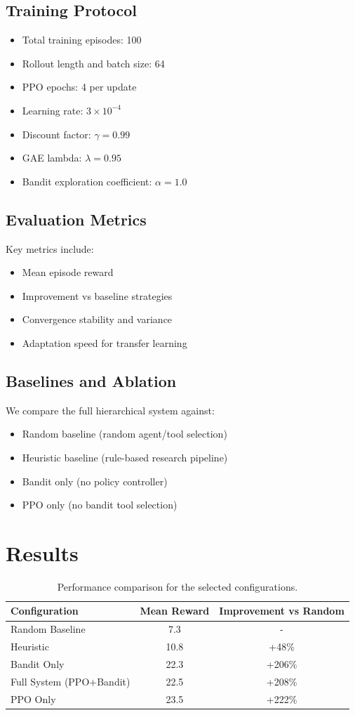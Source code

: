 \documentclass[11pt,a4paper]{article}
\begin{document}
\subsection{Training Protocol}
\begin{itemize}[leftmargin=*]
  \item Total training episodes: 100
  \item Rollout length and batch size: 64
  \item PPO epochs: 4 per update
  \item Learning rate: $3\times10^{-4}$
  \item Discount factor: $\gamma = 0.99$
  \item GAE lambda: $\lambda = 0.95$
  \item Bandit exploration coefficient: $\alpha = 1.0$
\end{itemize}

\subsection{Evaluation Metrics}
Key metrics include:
\begin{itemize}[leftmargin=*]
  \item Mean episode reward
  \item Improvement vs baseline strategies
  \item Convergence stability and variance
  \item Adaptation speed for transfer learning
\end{itemize}

\subsection{Baselines and Ablation}
We compare the full hierarchical system against:
\begin{itemize}[leftmargin=*]
  \item Random baseline (random agent/tool selection)
  \item Heuristic baseline (rule-based research pipeline)
  \item Bandit only (no policy controller)
  \item PPO only (no bandit tool selection)
\end{itemize}

\section{Results}
\begin{table}[h!]
\centering
\begin{tabular}{lcc}
\toprule
Configuration & Mean Reward & Improvement vs Random \\
\midrule
Random Baseline & 7.3 & - \\
Heuristic & 10.8 & +48\% \\
Bandit Only & 22.3 & +206\% \\
Full System (PPO+Bandit) & 22.5 & +208\% \\
PPO Only & 23.5 & +222\% \\
\bottomrule
\end{tabular}
\caption{Performance comparison for the selected configurations.}
\end{table}
\end{document}
